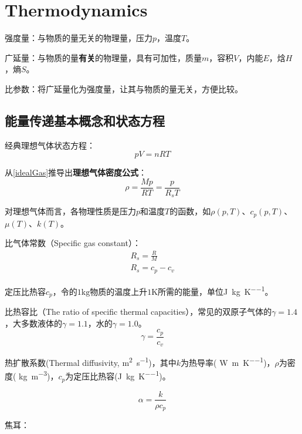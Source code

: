 \chapter{Thermodynamics}
强度量：与物质的量无关的物理量，压力$ p $，温度$ T $。

广延量：与物质的量\textbf{有关}的物理量，具有可加性，质量$ m $，容积$ V $，内能$ E $，焓$ H $，熵$ S $。

比参数：将广延量化为强度量，让其与物质的量无关，方便比较。

\section{能量传递基本概念和状态方程}

经典理想气体状态方程：
\begin{equation}
\label{idealGas}
pV=nRT
\end{equation}

从\autoref{idealGas}推导出\textbf{理想气体密度公式}：
\begin{equation}
\rho = \frac{Mp}{RT} = \frac{p}{R_s T}
\end{equation}

对理想气体而言，各物理性质是压力$ p $和温度$ T $的函数，如$ \rho(p,T) $、$ c_p(p,T) $、$ \mu(T) $、$ k(T) $。

比气体常数（Specific gas constant）：
\begin{gather}
R_s = \frac{R}{M} \\
R_s = c_p - c_v
\end{gather}

定压比热容$ c_p $，令的$ 1\si{\kilogram} $物质的温度上升$ 1\si{\kelvin} $所需的能量，单位\si{\joule\per\kilogram\per\kelvin}。

比热容比（The ratio of specific thermal capacities），常见的双原子气体的$ \gamma=1.4 $，大多数液体的$ \gamma=1.1 $，水的$ \gamma=1.0 $。
\begin{equation}
\gamma = \frac{c_p}{c_v}
\end{equation}

热扩散系数(Thermal diffusivity, \si{\meter\squared\per\second})，其中$ k $为热导率( \si{\watt\per\meter\per\kelvin})，$ \rho $为密度( \si{\kilogram\per\cubic\meter})，$ c_p $为定压比热容(\si{\joule\per\kilogram\per\kelvin})。

\begin{equation}
\alpha = \frac{k}{\rho c_p}
\end{equation}

焦耳：

